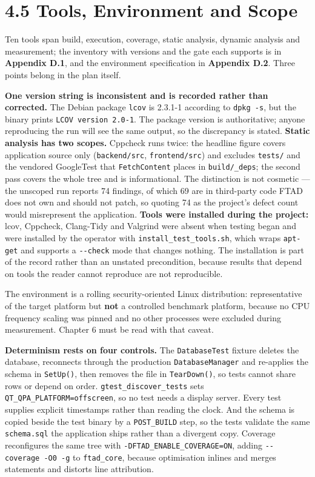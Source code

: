 \documentclass[
  12pt,
]{report}
\begin{document}
\section{4.5 Tools, Environment and
Scope}\label{tools-environment-and-scope}

Ten tools span build, execution, coverage, static analysis, dynamic
analysis and measurement; the inventory with versions and the gate each
supports is in \textbf{Appendix D.1}, and the environment specification
in \textbf{Appendix D.2}. Three points belong in the plan itself.

\textbf{One version string is inconsistent and is recorded rather than
corrected.} The Debian package \texttt{lcov} is 2.3.1-1 according to
\texttt{dpkg\ -s}, but the binary prints \texttt{LCOV\ version\ 2.0-1}.
The package version is authoritative; anyone reproducing the run will
see the same output, so the discrepancy is stated. \textbf{Static
analysis has two scopes.} Cppcheck runs twice: the headline figure
covers application source only (\texttt{backend/\allowbreak{}src},
\texttt{frontend/\allowbreak{}src}) and excludes \texttt{tests/\allowbreak{}} and the vendored
GoogleTest that \texttt{FetchContent} places in \texttt{build/\allowbreak{}\_deps};
the second pass covers the whole tree and is informational. The
distinction is not cosmetic --- the unscoped run reports 74 findings, of
which 69 are in third-party code FTAD does not own and should not patch,
so quoting 74 as the project's defect count would misrepresent the
application. \textbf{Tools were installed during the project:} lcov,
Cppcheck, Clang-Tidy and Valgrind were absent when testing began and
were installed by the operator with \texttt{install\_test\_tools.sh},
which wraps \texttt{apt-get} and supports a \texttt{-\/\allowbreak{}-check} mode that
changes nothing. The installation is part of the record rather than an
unstated precondition, because results that depend on tools the reader
cannot reproduce are not reproducible.

The environment is a rolling security-oriented Linux distribution:
representative of the target platform but \textbf{not} a controlled
benchmark platform, because no CPU frequency scaling was pinned and no
other processes were excluded during measurement. Chapter 6 must be read
with that caveat.

\textbf{Determinism rests on four controls.} The \texttt{DatabaseTest}
fixture deletes the database, reconnects through the production
\texttt{DatabaseManager} and re-applies the schema in \texttt{SetUp()},
then removes the file in \texttt{TearDown()}, so tests cannot share rows
or depend on order. \texttt{gtest\_discover\_tests} sets
\texttt{QT\_QPA\_PLATFORM=offscreen}, so no test needs a display server.
Every test supplies explicit timestamps rather than reading the clock.
And the schema is copied beside the test binary by a
\texttt{POST\_BUILD} step, so the tests validate the same
\texttt{schema.sql} the application ships rather than a divergent copy.
Coverage reconfigures the same tree with
\texttt{-DFTAD\_ENABLE\_COVERAGE=ON}, adding
\texttt{-\/\allowbreak{}-coverage\ -O0\ -g} to \texttt{ftad\_core}, because
optimisation inlines and merges statements and distorts line
attribution.
\end{document}

